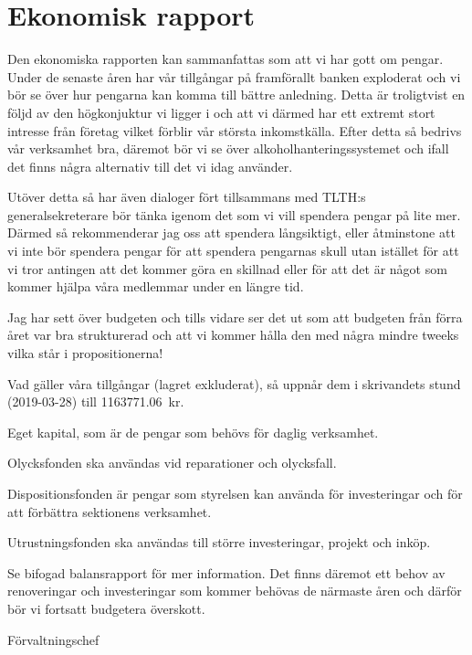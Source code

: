 \documentclass[../_main/handlingar.tex]{subfiles}
\begin{document}
\section{Ekonomisk rapport}

Den ekonomiska rapporten kan sammanfattas som att vi har gott om pengar. Under de senaste åren har vår tillgångar på framförallt banken exploderat och vi bör se över hur pengarna kan komma till bättre anledning. Detta är troligtvist en följd av den högkonjuktur vi ligger i och att vi därmed har ett extremt stort intresse från företag vilket förblir vår största inkomstkälla. Efter detta så bedrivs vår verksamhet bra, däremot bör vi se över alkoholhanteringssystemet och ifall det finns några alternativ till det vi idag använder.


Utöver detta så har även dialoger fört tillsammans med TLTH:s generalsekreterare bör tänka igenom det som vi vill spendera pengar på lite mer. 
Därmed så rekommenderar jag oss att spendera långsiktigt, eller åtminstone att vi inte bör spendera pengar för att spendera pengarnas skull utan istället för att vi tror antingen att det kommer göra en skillnad eller för att det är något som kommer hjälpa våra medlemmar under en längre tid.

Jag har sett över budgeten och tills vidare ser det ut som att budgeten från förra året var bra strukturerad och att vi kommer hålla den med några mindre tweeks vilka står i propositionerna!

Vad gäller våra tillgångar (lagret exkluderat), så uppnår dem i skrivandets stund (2019-03-28) till \SI{1 163 771,06}{kr}. 
\begin{dashlist}
	\item Eget kapital, som är de pengar som behövs för daglig verksamhet.
	\item Olycksfonden ska användas vid reparationer och olycksfall.
	\item Dispositionsfonden är pengar som styrelsen kan använda för investeringar och för att förbättra sektionens verksamhet.
	\item Utrustningsfonden ska användas till större investeringar, projekt och inköp.
\end{dashlist}

Se bifogad balansrapport för mer information. Det finns däremot ett behov av renoveringar och investeringar som kommer behövas de närmaste åren och därför bör vi fortsatt budgetera överskott.

\begin{signatures}{1}
	\mvh
	\signature{\fvc}{Förvaltningschef}
\end{signatures}
\end{document}
